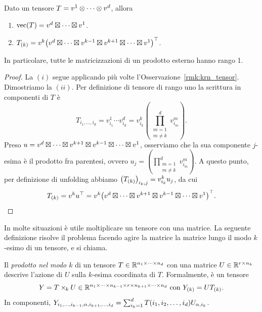 \begin{lemma}
	\label{lhm:vec_unf_rk1}
	Dato un tensore $ T = v^1 \otimes \cdots \otimes v^d $, allora
	\begin{enumerate}[label=(\roman*)]
		\item $\operatorname{vec}(T) = v^d \mathbin{\boxtimes} \cdots \mathbin{\boxtimes} v^1$.
		\item $ \Tm{T}{k} = v^k\left( v^d \krn \cdots \krn v^{k-1} \krn v^{k+1} \krn \cdots
			      \krn v^1 \right)^{\top}$.
	\end{enumerate}
	In particolare, tutte le matricizzazioni di un prodotto esterno hanno rango 1.
\end{lemma}
\begin{proof}
	La $ (i) $ segue applicando più volte l'Osservazione~\ref{rmk:krn_tensor}. Dimostriamo la $ (ii)
	$. Per definizione di tensore di rango uno la scrittura in componenti di $ T $ è
	\begin{equation*}
		T_{i_1, \ldots, i_{d}} = v^1_{i_1} \cdots v^d_{i_{d}} = v^k_{i_{k}} \left( \prod_{\substack{m=1
				\\ m\neq k}}^d v^m_{i_{m}}\right).
	\end{equation*}
	Preso $ u = v^d \mathbin{\boxtimes} \cdots \mathbin{\boxtimes} v^{k+1} \mathbin{\boxtimes} v^{k-1} \mathbin{\boxtimes} \cdots \mathbin{\boxtimes} v^1 $, osserviamo che la
	sua componente $ j $-esima è il prodotto fra parentesi, ovvero $ u_{j} =\left( \prod_{\substack{m=1
				\\ m\neq k}}^d v^m_{i_{m}}\right) $. A questo punto, per definizione di unfolding abbiamo
	$ \left( \Tm{T}{k} \right)_{i_{k},j} = v^k_{i_{k}}u_{j}$, da cui
	\begin{equation*}
		\Tm{T}{k} = v^k u^{\top} = v^k \left( v^d \krn \cdots \krn v^{k+1} \krn v^{k-1} \krn \cdots \krn
		v^1 \right)^{\top}.
	\end{equation*}
\end{proof}

In molte situazioni è utile moltiplicare un tensore con una matrice. La seguente definizione risolve
il problema facendo agire la matrice la matrice lungo il modo $ k $-esimo di un tensore, e si
chiama.
\begin{definition}
	Il \emph{prodotto nel modo $ k $} di un tensore $ T \in \Rmsiz! $ con una matrice $ U \in
		\mathbb{R}^{r \times n_k} $ descrive l'azione di $ U $ sulla $ k $-esima coordinata di $ T $. Formalmente, è un tensore
	\[
		Y = T \ttm U \in \R^{\ssiz{r}} \text{ con } \Tm{Y}{k} = U \Tm{T}{k}
		.\]
	In componenti, $ Y_{\siwc{\alpha}} = \sum_{i_k = 1}^d T(\miwc) U_{\alpha, i_k} $.
\end{definition}


